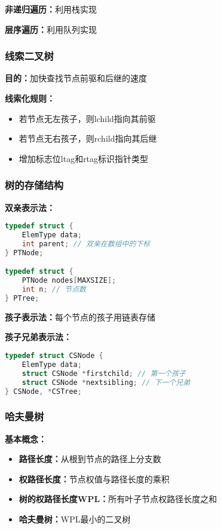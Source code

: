 \documentclass[12pt,a4paper]{amsart}
\begin{document}
\textbf{非递归遍历：}利用栈实现

\textbf{层序遍历：}利用队列实现

\subsubsection{线索二叉树}

\textbf{目的：}加快查找节点前驱和后继的速度

\textbf{线索化规则：}
\begin{itemize}
\item 若节点无左孩子，则lchild指向其前驱
\item 若节点无右孩子，则rchild指向其后继
\item 增加标志位ltag和rtag标识指针类型
\end{itemize}

\subsubsection{树的存储结构}

\textbf{双亲表示法：}
\begin{lstlisting}[language=C++]
typedef struct {
    ElemType data;
    int parent; // 双亲在数组中的下标
} PTNode;

typedef struct {
    PTNode nodes[MAXSIZE];
    int n; // 节点数
} PTree;
\end{lstlisting}

\textbf{孩子表示法：}每个节点的孩子用链表存储

\textbf{孩子兄弟表示法：}
\begin{lstlisting}[language=C++]
typedef struct CSNode {
    ElemType data;
    struct CSNode *firstchild; // 第一个孩子
    struct CSNode *nextsibling; // 下一个兄弟
} CSNode, *CSTree;
\end{lstlisting}

\subsubsection{哈夫曼树}

\textbf{基本概念：}
\begin{itemize}
\item \textbf{路径长度：}从根到节点的路径上分支数
\item \textbf{权路径长度：}节点权值与路径长度的乘积
\item \textbf{树的权路径长度WPL：}所有叶子节点权路径长度之和
\item \textbf{哈夫曼树：}WPL最小的二叉树
\end{itemize}
\end{document}
